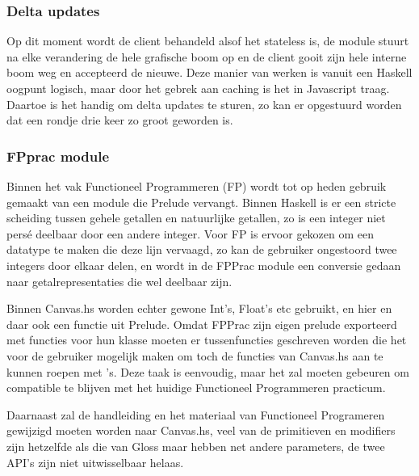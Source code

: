 \subsubsection{Delta updates} \label{subsub:deltas}
Op dit moment wordt de client behandeld alsof het stateless is, de module stuurt na elke verandering de hele grafische boom op en de client gooit zijn hele interne boom weg en accepteerd de nieuwe. Deze manier van werken is vanuit een Haskell oogpunt logisch, maar door het gebrek aan caching is het in Javascript traag. Daartoe is het handig om delta updates te sturen, zo kan er opgestuurd worden dat een rondje drie keer zo groot geworden is.

\subsubsection{FPprac module}
Binnen het vak Functioneel Programmeren (FP) wordt tot op heden gebruik gemaakt van een module die Prelude vervangt. Binnen Haskell is er een stricte scheiding tussen gehele getallen en natuurlijke getallen, zo is een integer niet persé deelbaar door een andere integer. Voor FP is ervoor gekozen om een  datatype te maken die deze lijn vervaagd, zo kan de gebruiker ongestoord twee integers door elkaar delen, en wordt in de FPPrac module een conversie gedaan naar getalrepresentaties die wel deelbaar zijn.

Binnen Canvas.hs worden echter gewone Int's, Float's etc gebruikt, en hier en daar ook een functie uit Prelude. Omdat FPPrac zijn eigen prelude exporteerd met functies voor hun  klasse moeten er tussenfuncties geschreven worden die het voor de gebruiker mogelijk maken om toch de functies van Canvas.hs aan te kunnen roepen met 's. Deze taak is eenvoudig, maar het zal moeten gebeuren om compatible te blijven met het huidige Functioneel Programmeren practicum.

Daarnaast zal de handleiding en het materiaal van Functioneel Programeren gewijzigd moeten worden naar Canvas.hs, veel van de primitieven en modifiers zijn hetzelfde als die van Gloss maar hebben net andere parameters, de twee API's zijn niet uitwisselbaar helaas.
